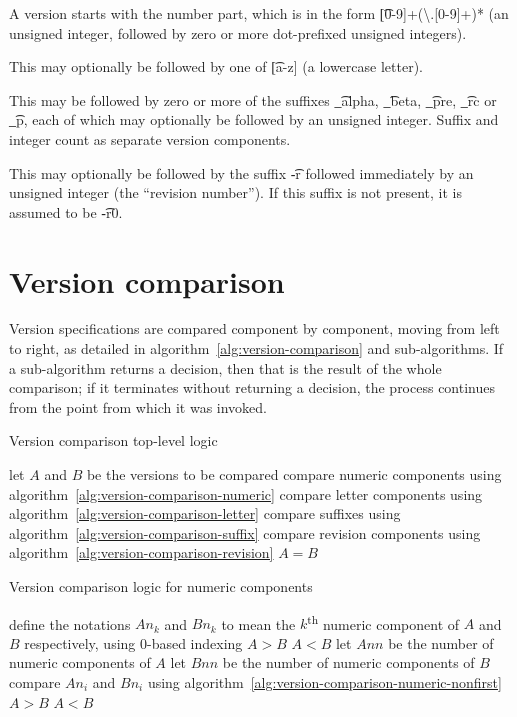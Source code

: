 A version starts with the number part, which is in the form \t{[0-9]+(\textbackslash.[0-9]+)*}
(an unsigned integer, followed by zero or more dot-prefixed unsigned integers).

This may optionally be followed by one of \t{[a-z]} (a lowercase letter).

This may be followed by zero or more of the suffixes \t{_alpha}, \t{_beta}, \t{_pre}, \t{_rc}
or \t{_p}, each of which may optionally be followed by an unsigned integer. Suffix and integer
count as separate version components.

This may optionally be followed by the suffix \t{-r} followed immediately by an unsigned integer
(the ``revision number''). If this suffix is not present, it is assumed to be \t{-r0}.

\section{Version comparison}

Version specifications are compared component by component, moving from left to right,
as detailed in algorithm~\ref{alg:version-comparison} and sub-algorithms.
If a sub-algorithm returns a decision, then that is the result of the whole comparison;
if it terminates without returning a decision, the process continues from the point
from which it was invoked.

\begin{algorithm}[p]
\caption{Version comparison top-level logic} \label{alg:version-comparison}
\begin{algorithmic}[1]
    \STATE let $A$ and $B$ be the versions to be compared
    \STATE compare numeric components using algorithm~\ref{alg:version-comparison-numeric}
    \STATE compare letter components using algorithm~\ref{alg:version-comparison-letter}
    \STATE compare suffixes using algorithm~\ref{alg:version-comparison-suffix}
    \STATE compare revision components using algorithm~\ref{alg:version-comparison-revision}
    \RETURN $A=B$
\end{algorithmic}
\end{algorithm}

\begin{algorithm}[p]
\caption{Version comparison logic for numeric components} \label{alg:version-comparison-numeric}
\begin{algorithmic}[1]
  \STATE define the notations $An_k$ and $Bn_k$ to mean the $k$\textsuperscript{th} numeric
      component of $A$ and $B$ respectively, using $0$-based indexing
    \RETURN $A>B$
    \RETURN $A<B$
  \ENDIF
  \STATE let $Ann$ be the number of numeric components of $A$
  \STATE let $Bnn$ be the number of numeric components of $B$
    \STATE compare $An_i$ and $Bn_i$ using algorithm~\ref{alg:version-comparison-numeric-nonfirst}
  \ENDFOR
    \RETURN $A>B$
    \RETURN $A<B$
  \ENDIF
\end{algorithmic}
\end{algorithm}

